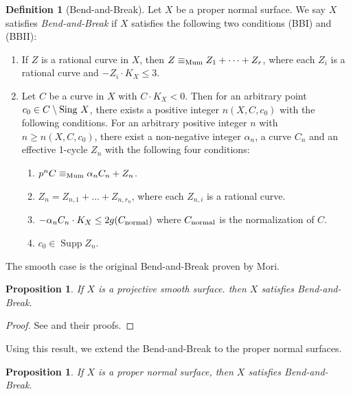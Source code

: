 \documentclass[12pt,twoside]{amsart}
\newcommand{\Supp}[0]{{\operatorname{Supp}}}
\newtheorem{prop}[thm]{Proposition}
\theoremstyle{definition}
\newtheorem{dfn}[thm]{Definition}
\begin{document}
\begin{dfn}[Bend-and-Break]\label{defbb}
Let $X$ be a proper normal surface. 
We say $X$ satisfies {\em Bend-and-Break} 
if $X$ satisfies the following two conditions (BBI) and (BBII):
\begin{enumerate}
\item[(BBI)]{
If $Z$ is a rational curve in $X$, 
then $Z \equiv_{\rm Mum} Z_1+ \dots +Z_r$, 
where each $Z_i$ is a rational curve and $-Z_i\cdot K_X \leq 3$.}

\item[(BBII)]{
Let $C$ be a curve in $X$ with $C\cdot K_X<0$. 
Then for an arbitrary point $c_0 \in C \setminus {\rm Sing}~X$, 
there exists a positive integer $n(X, C, c_0)$ with the following conditions. 
For an arbitrary positive integer $n$ with $n \geq n(X, C, c_0)$, 
there exist a non-negative integer $\alpha_n$, 
a curve $C_n$ and an effective 1-cycle $Z_n$ 
with the following four conditions:
\begin{enumerate}
\item{$p^n C \equiv_{\rm Mum} \alpha_nC_n + Z_n$.}
\item{$Z_n = Z_{n,1} + \dots + Z_{n,r_n}$, 
where each $Z_{n,i}$ is a rational curve.} 
\item{$-\alpha_nC_n\cdot K_X \leq 2g(C_{\rm normal})$ 
where $C_{\rm normal}$ is the normalization of $C$.} 
\item{$c_0 \in \Supp Z_n$.} 
\end{enumerate}
}
\end{enumerate}
\end{dfn}

The smooth case is the original Bend-and-Break proven by Mori.

\begin{prop}
If $X$ is a projective smooth surface. 
then $X$ satisfies Bend-and-Break. 
\end{prop}

\begin{proof}
See \cite[Theorem~4 and Theorem~5]{Mori1} and their proofs.
\end{proof}

Using this result, 
we extend the Bend-and-Break to the proper normal surfaces.

\begin{prop}\label{propbb}
If $X$ is a proper normal surface, 
then $X$ satisfies Bend-and-Break. 
\end{prop}
\end{document}
